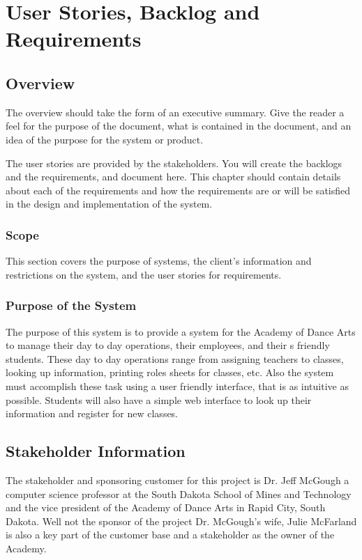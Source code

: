 \chapter{User Stories, Backlog and Requirements}
\section{Overview}


The overview should take the form of an executive summary.  Give the reader a feel 
for the purpose of the document, what is contained in the document, and an idea 
of the purpose for the system or product. 

The user stories are provided by the stakeholders.  You will create the backlogs and the requirements, and document here. This chapter should contain details about each of the requirements and how the requirements are or will be satisfied in the design and implementation of the system.

\subsection{Scope}

This section covers the purpose of systems, the client's information and restrictions on the system, and the user stories for requirements. 


\subsection{Purpose of the System}
The purpose of this system is to provide a system for the Academy of Dance Arts to manage their day to day operations, their employees, and their s friendly students. These day to day operations range from assigning teachers to classes, looking up information, printing roles sheets for classes, etc.  Also the system must accomplish these task using a user friendly interface, that is as intuitive as possible. Students will also have a simple web interface to look up their information and register for new classes.


\section{Stakeholder Information}

The stakeholder and sponsoring customer for this project is Dr. Jeff McGough a computer science professor at the South Dakota School of Mines and Technology and the vice president of the Academy of Dance Arts in Rapid City, South Dakota.
Well not the sponsor of the project Dr. McGough's wife, Julie McFarland is also a key part of the customer base and a stakeholder as the owner of the Academy. 


